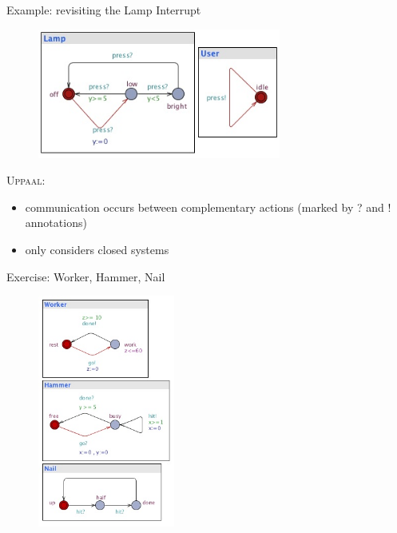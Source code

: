 \documentclass{beamer}
\def\uppaal{\textsc{Uppaal}}
\begin{document}
\begin{slide}{Example: revisiting the Lamp Interrupt}
\small

\begin{figure}[htb]
  \centering
  \includegraphics[width=8cm]{./images/lamp2.jpg}\\
\end{figure}


\begin{block}{\uppaal:}
\begin{itemize}
\item communication occurs between \alert{complementary
  actions} (marked by \alert{?} and \alert{!} annotations)
\item only considers \alert{closed} systems 
\end{itemize}
\end{block}
\end{slide}

\begin{slide}{Exercise: Worker, Hammer, Nail}
\small

\begin{figure}[htb]
  \centering
  \includegraphics[width=45mm]{./images/WHN.jpg}\\
\end{figure}
\end{slide}
\end{document}
